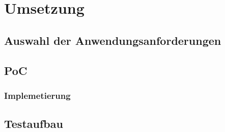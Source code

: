 \chapter{Umsetzung}
\label{ch:implementation}


%
%
\section{Auswahl der Anwendungsanforderungen}
\label{sec:implementation:selection}


%
%
\section{PoC}
\label{sec:implementation:poc}



\subsection{Implemetierung}
\label{subsec:implementation:poc:implementation}


\section{Testaufbau}
\label{subsec:implementation:poc:testing}
